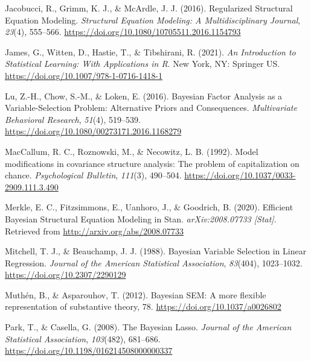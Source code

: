 \documentclass[
  man, donotrepeattitle,floatsintext]{apa6}
\newlength{\cslhangindent}
\newlength{\cslentryspacingunit} %
\newenvironment{CSLReferences}[2] %
 {%
  \setlength{\parindent}{0pt}
  \ifodd #1
  \let\oldpar\par
  \def\par{\hangindent=\cslhangindent\oldpar}
  \fi
  \setlength{\parskip}{#2\cslentryspacingunit}
 }%
 {}
\begin{document}
\begin{CSLReferences}{1}{0}
\leavevmode{}%
Jacobucci, R., Grimm, K. J., \& McArdle, J. J. (2016). Regularized {Structural} {Equation} {Modeling}. \emph{Structural Equation Modeling: A Multidisciplinary Journal}, \emph{23}(4), 555--566. \url{https://doi.org/10.1080/10705511.2016.1154793}

\leavevmode{}%
James, G., Witten, D., Hastie, T., \& Tibshirani, R. (2021). \emph{An {Introduction} to {Statistical} {Learning}: With {Applications} in {R}}. New York, NY: Springer US. \url{https://doi.org/10.1007/978-1-0716-1418-1}

\leavevmode{}%
Lu, Z.-H., Chow, S.-M., \& Loken, E. (2016). Bayesian {Factor} {Analysis} as a {Variable}-{Selection} {Problem}: {Alternative} {Priors} and {Consequences}. \emph{Multivariate Behavioral Research}, \emph{51}(4), 519--539. \url{https://doi.org/10.1080/00273171.2016.1168279}

\leavevmode{}%
MacCallum, R. C., Roznowski, M., \& Necowitz, L. B. (1992). Model modifications in covariance structure analysis: The problem of capitalization on chance. \emph{Psychological Bulletin}, \emph{111}(3), 490--504. \url{https://doi.org/10.1037/0033-2909.111.3.490}

\leavevmode{}%
Merkle, E. C., Fitzsimmons, E., Uanhoro, J., \& Goodrich, B. (2020). Efficient {Bayesian} {Structural} {Equation} {Modeling} in {Stan}. \emph{arXiv:2008.07733 {[}Stat{]}}. Retrieved from \url{http://arxiv.org/abs/2008.07733}

\leavevmode{}%
Mitchell, T. J., \& Beauchamp, J. J. (1988). Bayesian {Variable} {Selection} in {Linear} {Regression}. \emph{Journal of the American Statistical Association}, \emph{83}(404), 1023--1032. \url{https://doi.org/10.2307/2290129}

\leavevmode{}%
Muthén, B., \& Asparouhov, T. (2012). Bayesian {SEM}: {A} more ﬂexible representation of substantive theory, 78. \url{https://doi.org/10.1037/a0026802}

\leavevmode{}%
Park, T., \& Casella, G. (2008). The {Bayesian} {Lasso}. \emph{Journal of the American Statistical Association}, \emph{103}(482), 681--686. \url{https://doi.org/10.1198/016214508000000337}


\end{CSLReferences}
\end{document}
